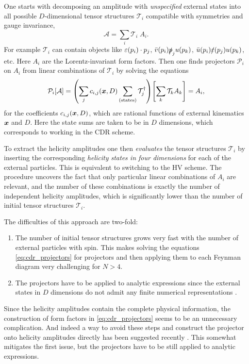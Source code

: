 One starts with decomposing an amplitude with \emph{unspecified} external states into all possible $D$-dimensional tensor structures $\mathcal{T}_i$ compatible
with symmetries and gauge invariance,
\begin{equation}
  \mathcal{A}  = \sum_{i} \mathcal{T}_i\;A_i.
\end{equation}
For example $\mathcal{T}_i$ can contain objects like $\sp(\varepsilon(p_i),p_j)$, $\bar{v}(p_i) \slashed{p}_j u(p_k) $, $\bar{u}(p_i) \slashed{\varepsilon}(p_j) u(p_k)$, etc.
Here $A_i$ are the Lorentz-invariant form factors.
Then one finds projectors $\mathcal{P}_i$ on $A_i$ from linear combinations of $\mathcal{T}_i$ by solving the equations
\begin{equation} \label{eq:cdr_projectors}
  \mathcal{P}_i [\mathcal{A}] = \qty(\sum_j c_{i,j}(\vb*{x},D) \sum_\text{(states)} \mathcal{T}^{\dagger}_j) \qty[\sum_{k} \mathcal{T}_k A_k] = A_i, 
\end{equation}
for the coefficients $c_{i,j}(\vb*{x},D)$, which are rational functions of external kinematics $\vb*{x}$ and $D$.
Here the state sums are taken to be in $D$ dimensions, which corresponds to working in the CDR scheme.

To extract the helicity amplitudes one then \textit{evaluates} the tensor structures $\mathcal{T}_i$ 
by inserting the corresponding \textit{helicity states in four dimensions} for each of the external particles. 
This is equivalent to switching to the HV scheme.
The procedure uncovers the fact that only particular linear combinations of $A_i$ are relevant,
and the number of these combinations is exactly the number of independent helicity amplitudes, which is
significantly lower than the number of initial tensor structures $\mathcal{T}_i$.

The difficulties of this approach are two-fold:
\begin{enumerate}
  \item The number of initial tensor structures grows very fast with the number of external particles with spin.
    This makes solving the equations \cref{eq:cdr_projectors} for projectors and then applying them to each Feynman diagram very challenging for $N>4$.
  \item The projectors have to be applied to analytic expressions since the external states in $D$ dimensions do not admit any finite numerical representations \cite{Collins:1984xc}.
\end{enumerate}

Since the helicity amplitudes contain the complete physical information, 
the construction of form factors in  \cref{eq:cdr_projectors} seems to be an unnecessary complication.
And indeed a way to avoid these steps and construct the projector onto helicity amplitudes directly has been suggested recently \cite{Peraro:2019cjj}.
This somewhat mitigates the first issue, but the projectors have to be still applied to analytic expressions.

